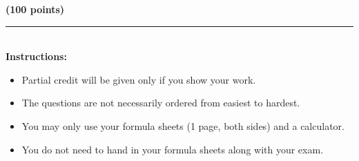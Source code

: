 

\begin{center}
  \hfill \textbf{(100 points)}
\end{center}

\vspace*{1in}

 \rule{5in}{.01in}\\[1in]

\textbf{Instructions:}\\
\begin{itemize}
\item {\large Partial credit will be given only if you show your work.}
\item {\large The questions are not necessarily ordered from easiest to hardest.}
\item {\large You may only use your formula sheets (1 page, both sides) and a calculator.}
\item {\large You do not need to hand in your formula sheets along with your exam.}
\end{itemize}